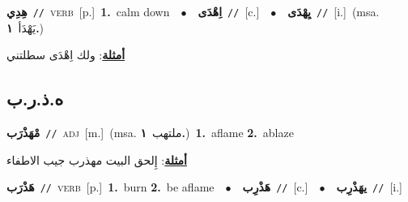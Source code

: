 \documentclass[10pt,a4paper,twoside]{article} %
\begin{document}
\begin{multicols}{2}
{\setlength\topsep{0pt}\textbf{\foreignlanguage{arabic}{هِدِي}}\ {\color{gray}\texttt{//}\color{black}}\ \textsc{verb}\ [p.]\ \textbf{1.}~calm down\ \ $\bullet$\ \ \setlength\topsep{0pt}\textbf{\foreignlanguage{arabic}{اِهْدَى}}\ {\color{gray}\texttt{//}\color{black}}\ [c.]\ \ $\bullet$\ \ \setlength\topsep{0pt}\textbf{\foreignlanguage{arabic}{يِهْدَى}}\ {\color{gray}\texttt{//}\color{black}}\ [i.]\ \color{gray}(msa. \foreignlanguage{arabic}{يَهْدَأ}~\foreignlanguage{arabic}{\textbf{١.}})\color{black}\  \begin{flushright}\color{gray}\foreignlanguage{arabic}{\textbf{\underline{\foreignlanguage{arabic}{أمثلة}}}: ولك اِهْدَى سطلتني}\end{flushright}\color{black}} \vspace{2mm}

\vspace{-3mm}
\subsection*{\color{blue}\foreignlanguage{arabic}{ه.ذ.ر.ب}\color{blue}{}} 

{\setlength\topsep{0pt}\textbf{\foreignlanguage{arabic}{مْهَذْرَب}}\ {\color{gray}\texttt{//}\color{black}}\ \textsc{adj}\ [m.]\ \color{gray}(msa. \foreignlanguage{arabic}{ملتهب}~\foreignlanguage{arabic}{\textbf{١.}})\color{black}\ \textbf{1.}~aflame  \textbf{2.}~ablaze\  \begin{flushright}\color{gray}\foreignlanguage{arabic}{\textbf{\underline{\foreignlanguage{arabic}{أمثلة}}}: إِلحق البيت مهذرب جيب الاطفاء}\end{flushright}\color{black}} \vspace{2mm}

{\setlength\topsep{0pt}\textbf{\foreignlanguage{arabic}{هَذْرَب}}\ {\color{gray}\texttt{//}\color{black}}\ \textsc{verb}\ [p.]\ \textbf{1.}~burn  \textbf{2.}~be aflame\ \ $\bullet$\ \ \setlength\topsep{0pt}\textbf{\foreignlanguage{arabic}{هَذْرِب}}\ {\color{gray}\texttt{//}\color{black}}\ [c.]\ \ $\bullet$\ \ \setlength\topsep{0pt}\textbf{\foreignlanguage{arabic}{يهَذْرِب}}\ {\color{gray}\texttt{//}\color{black}}\ [i.]\ } \vspace{2mm}


\end{multicols}
\end{document}
